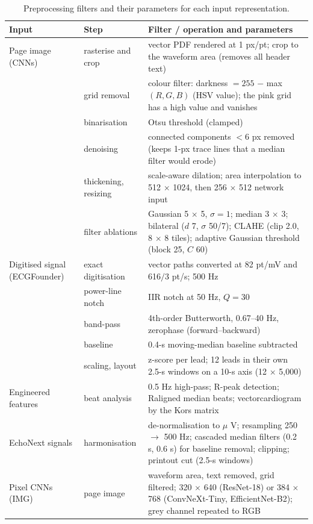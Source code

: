 \begin{table}[htbp]
\caption{Preprocessing filters and their parameters for each input representation.}\label{tab:3.1}
\small
\begin{tabular}{>{\raggedright\arraybackslash\hspace{0pt}}p{}>{\raggedright\arraybackslash\hspace{0pt}}p{}>{\raggedright\arraybackslash\hspace{0pt}}p{}}
\toprule
\textbf{Input} & \textbf{Step} & \textbf{Filter / operation and parameters} \\
\midrule
Page image (CNNs) & rasterise and crop & vector PDF rendered at 1 px/pt; crop to the waveform area (removes all header text) \\
 & grid removal & colour filter: darkness $=255$ $-$ max$(R, G, B)$ (HSV value); the pink grid has a high value and vanishes \\
 & binarisation & Otsu threshold (clamped) \\
 & denoising & connected components $<6$ px removed (keeps 1-px trace lines that a median filter would erode) \\
 & thickening, resizing & scale-aware dilation; area interpolation to 512 $\times$ 1024, then 256 $\times$ 512 network input \\
 & filter ablations & Gaussian 5 $\times$ 5, $\sigma =1$; median 3 $\times$ 3; bilateral ($ d$ 7, $\sigma$ 50/7); CLAHE (clip 2.0, 8 $\times$ 8 tiles); adaptive Gaussian threshold (block 25, $ C$ 60) \\
\midrule
Digitised signal (ECGFounder) & exact digitisation & vector paths converted at 82 pt/mV and 616$/$3 pt/s; 500 Hz \\
 & power-line notch & IIR notch at 50 Hz, $Q =30$ \\
 & band-pass & 4th-order Butterworth, 0.67--40 Hz, zerophase (forward--backward) \\
 & baseline & 0.4-s moving-median baseline subtracted \\
 & scaling, layout & z-score per lead; 12 leads in their own 2.5-s windows on a 10-s axis (12 $\times$ 5,000) \\
\midrule
\midrule
Engineered features & beat analysis & 0.5 Hz high-pass; R-peak detection; Raligned median beats; vectorcardiogram by the Kors matrix \\
\midrule
EchoNext signals & harmonisation & de-normalisation to $\mu$ V; resampling 250 $\rightarrow$ 500 Hz; cascaded median filters (0.2 s, 0.6 s) for baseline removal; clipping; printout cut (2.5-s windows) \\
\midrule
Pixel CNNs (IMG) & page image & waveform area, text removed, grid filtered; 320 $\times$ 640 (ResNet-18) or 384 $\times$ 768 (ConvNeXt-Tiny, EfficientNet-B2); grey channel repeated to RGB \\
\bottomrule
\end{tabular}
\end{table}
